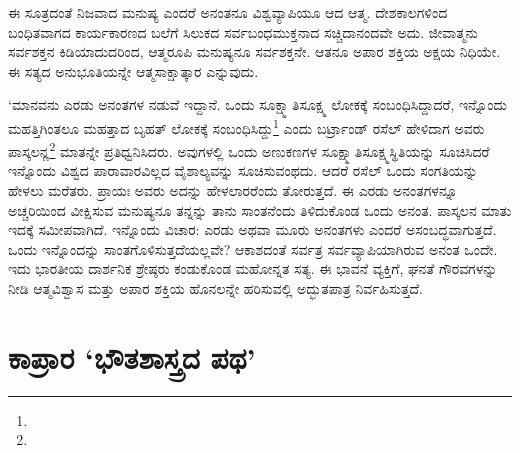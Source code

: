 ಈ ಸೂತ್ರದಂತೆ ನಿಜವಾದ ಮನುಷ್ಯ ಎಂದರೆ ಅನಂತನೂ ವಿಶ್ವವ್ಯಾಪಿಯೂ ಆದ ಆತ್ಮ. ದೇಶಕಾಲಗಳಿಂದ ಬಂಧಿತವಾಗದ ಕಾರ್ಯಕಾರಣದ ಬಲೆಗೆ ಸಿಲುಕದ ಸರ್ವಬಂಧಮುಕ್ತನಾದ ಸಚ್ಚಿದಾನಂದವೇ ಅದು. ಜೀವಾತ್ಮನು ಸರ್ವಶಕ್ತನ ಕಿಡಿಯಾದುದರಿಂದ, ಆತ್ಮರೂಪಿ ಮನುಷ್ಯನೂ ಸರ್ವಶಕ್ತನೇ. ಆತನೂ ಅಪಾರ ಶಕ್ತಿಯ ಅಕ್ಷಯ ನಿಧಿಯೇ. ಈ ಸತ್ಯದ ಅನುಭೂತಿಯನ್ನೇ ಆತ್ಮಸಾಕ್ಷಾತ್ಕಾರ ಎನ್ನುವುದು.

‘ಮಾನವನು ಎರಡು ಅನಂತಗಳ ನಡುವೆ ಇದ್ದಾನೆ. ಒಂದು ಸೂಕ್ಷ್ಮಾತಿಸೂಕ್ಷ್ಮ ಲೋಕಕ್ಕೆ ಸಂಬಂಧಿಸಿದ್ದಾದರೆ, ಇನ್ನೊಂದು ಮಹತ್ತಿಗಿಂತಲೂ ಮಹತ್ತಾದ ಬೃಹತ್ ಲೋಕಕ್ಕೆ ಸಂಬಂಧಿಸಿದ್ದು\footnote{\hfill{}} ಎಂದು ಬರ್ಟ್ರಾಂಡ್ ರಸೆಲ್ ಹೇಳಿದಾಗ ಅವರು ಪಾಸ್ಕಲನ್ಣ\footnote{

\hfill{}} ಮಾತನ್ನೇ ಪ್ರತಿಧ್ವನಿಸಿದರು. ಅವುಗಳಲ್ಲಿ ಒಂದು ಅಣುಕಣಗಳ ಸೂಕ್ಷ್ಮಾತಿಸೂಕ್ಷ್ಮಸ್ಥಿತಿಯನ್ನು ಸೂಚಿಸಿದರೆ ಇನ್ನೊಂದು ವಿಶ್ವದ ಪಾರಾವಾರವಿಲ್ಲದ ವೈಶಾಲ್ಯವನ್ನು ಸೂಚಿಸುವಂಥದು. ಆದರೆ ರಸೆಲ್ ಒಂದು ಸಂಗತಿಯನ್ನು ಹೇಳಲು ಮರೆತರು. ಪ್ರಾಯಃ ಅವರು ಅದನ್ನು ಹೇಳಲಾರರೆಂದು ತೋರುತ್ತದೆ. ಈ ಎರಡು ಅನಂತಗಳನ್ನೂ ಅಚ್ಚರಿಯಿಂದ ವೀಕ್ಷಿಸುವ ಮನುಷ್ಯನೂ ತನ್ನನ್ನು ತಾನು ಸಾಂತನೆಂದು ತಿಳಿದುಕೊಂಡ ಒಂದು ಅನಂತ. ಪಾಸ್ಕಲನ ಮಾತು ಇದಕ್ಕೆ ಸಮೀಪವಾಗಿದೆ. ಇನ್ನೊಂದು ವಿಚಾರ: ಎರಡು ಅಥವಾ ಮೂರು ಅನಂತಗಳು ಎಂದರೆ ಅಸಂಬದ್ಧವಾಗುತ್ತದೆ. ಒಂದು ಇನ್ನೊಂದನ್ನು ಸಾಂತಗೊಳಿಸುತ್ತದೆಯಲ್ಲವೇ? ಆಕಾಶದಂತೆ ಸರ್ವತ್ರ ಸರ್ವವ್ಯಾಪಿಯಾಗಿರುವ ಅನಂತ ಒಂದೇ. ಇದು ಭಾರತೀಯ ದಾರ್ಶನಿಕ ಶ್ರೇಷ್ಠರು ಕಂಡುಕೊಂಡ ಮಹೋನ್ನತ ಸತ್ಯ. ಈ ಭಾವನೆ ವ್ಯಕ್ತಿಗೆ, ಘನತೆ ಗೌರವಗಳನ್ನು ನೀಡಿ ಆತ್ಮವಿಶ್ವಾಸ ಮತ್ತು ಅಪಾರ ಶಕ್ತಿಯ ಹೊನಲನ್ನೇ ಹರಿಸುವಲ್ಲಿ ಅದ್ಭುತಪಾತ್ರ ನಿರ್ವಹಿಸುತ್ತದೆ.


\section*{ಕಾಪ್ರಾರ ‘ಭೌತಶಾಸ್ತ್ರದ ಪಥ’}


